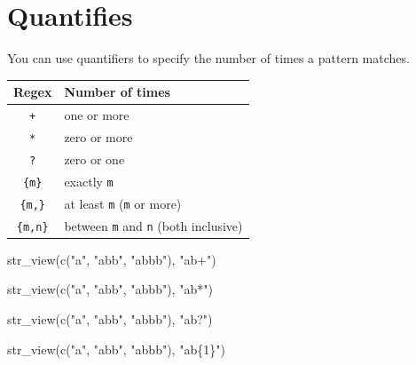 \documentclass[
]{book}
\newenvironment{Shaded}{\begin{snugshade}}{\end{snugshade}}
\newcommand{\FunctionTok}[1]{\textcolor[rgb]{0.00,0.00,0.00}{#1}}
\newcommand{\NormalTok}[1]{#1}
\newcommand{\StringTok}[1]{\textcolor[rgb]{0.31,0.60,0.02}{#1}}
\begin{document}
\hypertarget{quantifies}{%
\section{Quantifies}\label{quantifies}}

You can use quantifiers to specify the number of times a pattern matches.

\begin{longtable}[]{@{}cl@{}}
\toprule
Regex & Number of times \\
\midrule
\endhead
\texttt{+} & one or more \\
\texttt{*} & zero or more \\
\texttt{?} & zero or one \\
\texttt{\{m\}} & exactly \texttt{m} \\
\texttt{\{m,\}} & at least \texttt{m} (\texttt{m} or more) \\
\texttt{\{m,n\}} & between \texttt{m} and \texttt{n} (both inclusive) \\
\bottomrule
\end{longtable}

\begin{Shaded}
\begin{Highlighting}[]
\FunctionTok{str\_view}\NormalTok{(}\FunctionTok{c}\NormalTok{(}\StringTok{"a"}\NormalTok{, }\StringTok{"abb"}\NormalTok{, }\StringTok{"abbb"}\NormalTok{), }\StringTok{"ab+"}\NormalTok{)}
\end{Highlighting}
\end{Shaded}

\begin{Shaded}
\begin{Highlighting}[]
\FunctionTok{str\_view}\NormalTok{(}\FunctionTok{c}\NormalTok{(}\StringTok{"a"}\NormalTok{, }\StringTok{"abb"}\NormalTok{, }\StringTok{"abbb"}\NormalTok{), }\StringTok{"ab*"}\NormalTok{)}
\end{Highlighting}
\end{Shaded}

\begin{Shaded}
\begin{Highlighting}[]
\FunctionTok{str\_view}\NormalTok{(}\FunctionTok{c}\NormalTok{(}\StringTok{"a"}\NormalTok{, }\StringTok{"abb"}\NormalTok{, }\StringTok{"abbb"}\NormalTok{), }\StringTok{"ab?"}\NormalTok{)}
\end{Highlighting}
\end{Shaded}

\begin{Shaded}
\begin{Highlighting}[]
\FunctionTok{str\_view}\NormalTok{(}\FunctionTok{c}\NormalTok{(}\StringTok{"a"}\NormalTok{, }\StringTok{"abb"}\NormalTok{, }\StringTok{"abbb"}\NormalTok{), }\StringTok{"ab\{1\}"}\NormalTok{)}
\end{Highlighting}
\end{Shaded}
\end{document}
